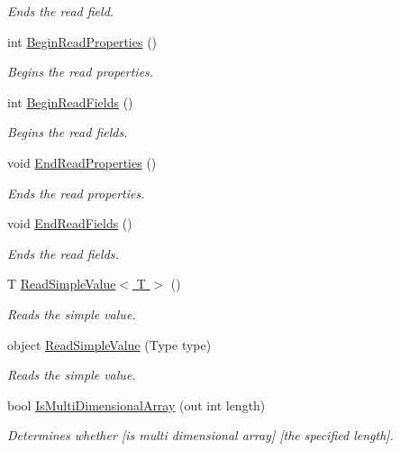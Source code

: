 \begin{DoxyCompactItemize}
\begin{DoxyCompactList}\small\item\em Ends the read field. \end{DoxyCompactList}\item 
int \hyperlink{interface_serialization_1_1_i_storage_a14c84cc7b9483b89881c5caef8e4f1a0}{Begin\+Read\+Properties} ()
\begin{DoxyCompactList}\small\item\em Begins the read properties. \end{DoxyCompactList}\item 
int \hyperlink{interface_serialization_1_1_i_storage_af7e9c21d8e723c2b7482d0ce7db7e3c5}{Begin\+Read\+Fields} ()
\begin{DoxyCompactList}\small\item\em Begins the read fields. \end{DoxyCompactList}\item 
void \hyperlink{interface_serialization_1_1_i_storage_a5e3376134f3047f247eaa2a6844389f3}{End\+Read\+Properties} ()
\begin{DoxyCompactList}\small\item\em Ends the read properties. \end{DoxyCompactList}\item 
void \hyperlink{interface_serialization_1_1_i_storage_af38f83f1eb0c5190fd0e4ad845ff0649}{End\+Read\+Fields} ()
\begin{DoxyCompactList}\small\item\em Ends the read fields. \end{DoxyCompactList}\item 
T \hyperlink{interface_serialization_1_1_i_storage_ae1e7a60cc8b12071f1866d2cac454f99}{Read\+Simple\+Value$<$ T $>$} ()
\begin{DoxyCompactList}\small\item\em Reads the simple value. \end{DoxyCompactList}\item 
object \hyperlink{interface_serialization_1_1_i_storage_a32b60329697e7f1d128801cc4ac7e614}{Read\+Simple\+Value} (Type type)
\begin{DoxyCompactList}\small\item\em Reads the simple value. \end{DoxyCompactList}\item 
bool \hyperlink{interface_serialization_1_1_i_storage_a9fd65cc423dabd2b49021e0e7f333356}{Is\+Multi\+Dimensional\+Array} (out int length)
\begin{DoxyCompactList}\small\item\em Determines whether \mbox{[}is multi dimensional array\mbox{]} \mbox{[}the specified length\mbox{]}. \end{DoxyCompactList}\item 

\end{DoxyCompactItemize}
